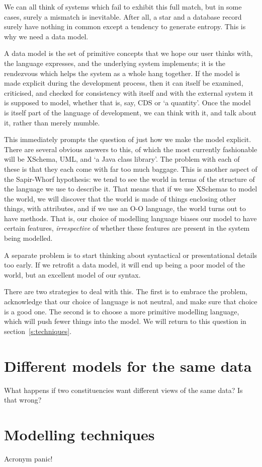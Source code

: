 \documentclass[11pt,twoside]{article}
\begin{document}
We can all think of systems which fail to exhibit this full match, but
in some cases, surely a mismatch is inevitable.  After all, a star and
a database record surely have nothing in common except a tendency to
generate entropy.  This is why we need a data model.

A data model is the set of primitive concepts that we hope our user
thinks with, the language expresses, and the underlying system
implements; it is the rendezvous which helps the system as a whole
hang together.  If the model is made explicit during the development
process, then it can itself be examined, criticised, and checked for
consistency with itself and with the external system it is
supposed to model, whether that is, say, CDS or `a quantity'.  Once
the model is itself part of the language of development, we can think
with it, and talk about it, rather than merely mumble.

This immediately prompts the question of just how we make the model
explicit.  There are several obvious answers to this, of which the
most currently fashionable will be XSchema, UML, and `a Java
class library'.  The problem with each of these is that they each come with
far too much baggage.  This is another aspect of the Sapir-Whorf
hypothesis: we tend to see the world in terms of the
structure of the language we use to describe it.  That means that if
we use XSchemas to model the world, we will discover that the world is
made of things enclosing other things, with attributes, and if we use an O-O language,
the world turns out to have methods.  That is, our choice of modelling
language biases our model to have certain features, \emph{irrespective} of
whether these features are present in the system being modelled.

A separate problem is to start thinking about syntactical or
presentational details too early.  If we retrofit a data model, it
will end up being a poor model of the world, but an excellent
model of our syntax.

There are two strategies to deal with this.  The first is to embrace
the problem, acknowledge that our choice of language is not neutral,
and make sure that choice is a good one.  The second is to choose a
more primitive modelling language, which will push fewer things into
the model.  We will return to this question in section~\ref{s:techniques}.



\section{Different models for the same data}

What happens if two constituencies want different views of the same
data?  Is that wrong?

\section{Modelling techniques\label{s:techniques}}

Acronym panic!
\end{document}
